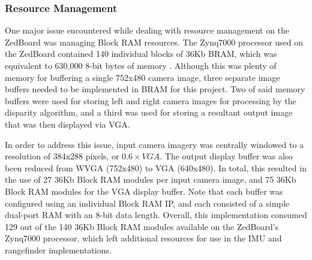 \subsubsection{Resource Management} \label{dataman}
One major issue encountered while dealing with resource management on the ZedBoard was managing Block RAM resources. The Zynq7000 processor used on the ZedBoard contained 140 individual blocks of 36Kb BRAM, which was equivalent to 630,000 8-bit bytes of memory \cite{zynq7bram}. Although this was plenty of memory for buffering a single 752x480 camera image, three separate image buffers needed to be implemented in BRAM for this project. Two of said memory buffers were used for storing left and right camera images for processing by the disparity algorithm, and a third was used for storing a resultant output image that was then displayed via VGA.
\par
In order to address this issue, input camera imagery was centrally windowed to a resolution of 384x288 pixels, or $0.6\times{}VGA$. The output display buffer was also been reduced from WVGA (752x480) to VGA (640x480). In total, this resulted in the use of 27 36Kb Block RAM modules per input camera image, and 75 36Kb Block RAM modules for the VGA display buffer. Note that each buffer was configured using an individual Block RAM IP, and each consisted of a simple dual-port RAM with an 8-bit data length. Overall, this implementation consumed 129 out of the 140 36Kb Block RAM modules available on the ZedBoard's Zynq7000 processor, which left additional resources for use in the IMU and rangefinder implementations. 